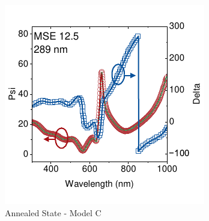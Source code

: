 \begin{figure}[t]
\begin{subfigure}[t]{0.4\textwidth}
        \includegraphics[width=\textwidth]{chapters/ellipsometry/image/t23_fixed_thick_x_void_p.pdf} %
        \caption{Annealed State - Model C}
        \label{fig:ellipsometry:static_fits:t23_fixed_thick_x_void}
    \end{subfigure}
    \caption{}
    \label{fig:ellipsometry:static_fits}
\end{figure}

